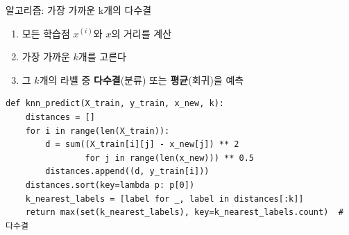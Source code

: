 \documentclass[aspectratio=169,11pt]{beamer}
\begin{document}

\begin{frame}[fragile]{알고리즘: 가장 가까운 k개의 다수결}
  \begin{enumerate}\small
    \item 모든 학습점 $x^{(i)}$와 $x$의 거리를 계산
    \item 가장 가까운 $k$개를 고른다
    \item 그 $k$개의 라벨 중 \textbf{다수결}(분류) 또는
      \textbf{평균}(회귀)을 예측
  \end{enumerate}
\begin{lstlisting}
def knn_predict(X_train, y_train, x_new, k):
    distances = []
    for i in range(len(X_train)):
        d = sum((X_train[i][j] - x_new[j]) ** 2
                for j in range(len(x_new))) ** 0.5
        distances.append((d, y_train[i]))
    distances.sort(key=lambda p: p[0])
    k_nearest_labels = [label for _, label in distances[:k]]
    return max(set(k_nearest_labels), key=k_nearest_labels.count)  # 다수결
\end{lstlisting}
\end{frame}
\end{document}
